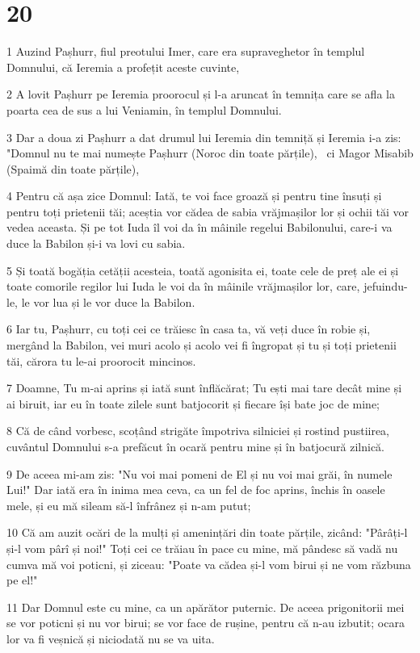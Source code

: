 \chapter{20}

\par 1 Auzind Pașhurr, fiul preotului Imer, care era supraveghetor în templul Domnului, că Ieremia a profețit aceste cuvinte,
\par 2 A lovit Pașhurr pe Ieremia proorocul și l-a aruncat în temnița care se afla la poarta cea de sus a lui Veniamin, în templul Domnului.
\par 3 Dar a doua zi Pașhurr a dat drumul lui Ieremia din temniță și Ieremia i-a zis: "Domnul nu te mai numește Pașhurr (Noroc din toate părțile),  ci Magor Misabib (Spaimă din toate părțile),
\par 4 Pentru că așa zice Domnul: Iată, te voi face groază și pentru tine însuți și pentru toți prietenii tăi; aceștia vor cădea de sabia vrăjmașilor lor și ochii tăi vor vedea aceasta. Și pe tot Iuda îl voi da în mâinile regelui Babilonului, care-i va duce la Babilon și-i va lovi cu sabia.
\par 5 Și toată bogăția cetății acesteia, toată agonisita ei, toate cele de preț ale ei și toate comorile regilor lui Iuda le voi da în mâinile vrăjmașilor lor, care, jefuindu-le, le vor lua și le vor duce la Babilon.
\par 6 Iar tu, Pașhurr, cu toți cei ce trăiesc în casa ta, vă veți duce în robie și, mergând la Babilon, vei muri acolo și acolo vei fi îngropat și tu și toți prietenii tăi, cărora tu le-ai proorocit mincinos.
\par 7 Doamne, Tu m-ai aprins și iată sunt înflăcărat; Tu ești mai tare decât mine și ai biruit, iar eu în toate zilele sunt batjocorit și fiecare își bate joc de mine;
\par 8 Că de când vorbesc, scoțând strigăte împotriva silniciei și rostind pustiirea, cuvântul Domnului s-a prefăcut în ocară pentru mine și în batjocură zilnică.
\par 9 De aceea mi-am zis: "Nu voi mai pomeni de El și nu voi mai grăi, în numele Lui!" Dar iată era în inima mea ceva, ca un fel de foc aprins, închis în oasele mele, și eu mă sileam să-l înfrânez și n-am putut;
\par 10 Că am auzit ocări de la mulți și amenințări din toate părțile, zicând: "Pârâți-l și-l vom pârî și noi!" Toți cei ce trăiau în pace cu mine, mă pândesc să vadă nu cumva mă voi poticni, și ziceau: "Poate va cădea și-l vom birui și ne vom răzbuna pe el!"
\par 11 Dar Domnul este cu mine, ca un apărător puternic. De aceea prigonitorii mei se vor poticni și nu vor birui; se vor face de rușine, pentru că n-au izbutit; ocara lor va fi veșnică și niciodată nu se va uita.
